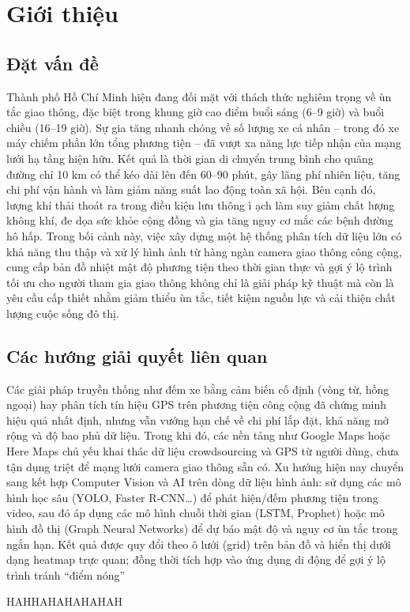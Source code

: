 \section{Giới thiệu}
\subsection{Đặt vấn đề}

Thành phố Hồ Chí Minh hiện đang đối mặt với thách thức nghiêm trọng về ùn tắc giao thông, đặc biệt trong khung giờ cao điểm buổi sáng (6–9 giờ) và buổi chiều (16–19 giờ). Sự gia tăng nhanh chóng về số lượng xe cá nhân – trong đó xe máy chiếm phần lớn tổng phương tiện – đã vượt xa năng lực tiếp nhận của mạng lưới hạ tầng hiện hữu. Kết quả là thời gian di chuyển trung bình cho quãng đường chỉ 10 km có thể kéo dài lên đến 60–90 phút, gây lãng phí nhiên liệu, tăng chi phí vận hành và làm giảm năng suất lao động toàn xã hội. Bên cạnh đó, lượng khí thải thoát ra trong điều kiện lưu thông ì ạch làm suy giảm chất lượng không khí, đe dọa sức khỏe cộng đồng và gia tăng nguy cơ mắc các bệnh đường hô hấp. Trong bối cảnh này, việc xây dựng một hệ thống phân tích dữ liệu lớn có khả năng thu thập và xử lý hình ảnh từ hàng ngàn camera giao thông công cộng, cung cấp bản đồ nhiệt mật độ phương tiện theo thời gian thực và gợi ý lộ trình tối ưu cho người tham gia giao thông không chỉ là giải pháp kỹ thuật mà còn là yêu cầu cấp thiết nhằm giảm thiểu ùn tắc, tiết kiệm nguồn lực và cải thiện chất lượng cuộc sống đô thị.
\subsection{Các hướng giải quyết liên quan}

Các giải pháp truyền thống như đếm xe bằng cảm biến cố định (vòng từ, hồng ngoại) hay phân tích tín hiệu GPS trên phương tiện công cộng đã chứng minh hiệu quả nhất định, nhưng vẫn vướng hạn chế về chi phí lắp đặt, khả năng mở rộng và độ bao phủ dữ liệu. Trong khi đó, các nền tảng như Google Maps hoặc Here Maps chủ yếu khai thác dữ liệu crowdsourcing và GPS từ người dùng, chưa tận dụng triệt để mạng lưới camera giao thông sẵn có. Xu hướng hiện nay chuyển sang kết hợp Computer Vision và AI trên dòng dữ liệu hình ảnh: sử dụng các mô hình học sâu (YOLO, Faster R‑CNN…) để phát hiện/đếm phương tiện trong video, sau đó áp dụng các mô hình chuỗi thời gian (LSTM, Prophet) hoặc mô hình đồ thị (Graph Neural Networks) để dự báo mật độ và nguy cơ ùn tắc trong ngắn hạn. Kết quả được quy đổi theo ô lưới (grid) trên bản đồ và hiển thị dưới dạng heatmap trực quan; đồng thời tích hợp vào ứng dụng di động để gợi ý lộ trình tránh “điểm nóng”

HAHHAHAHAHAHAH